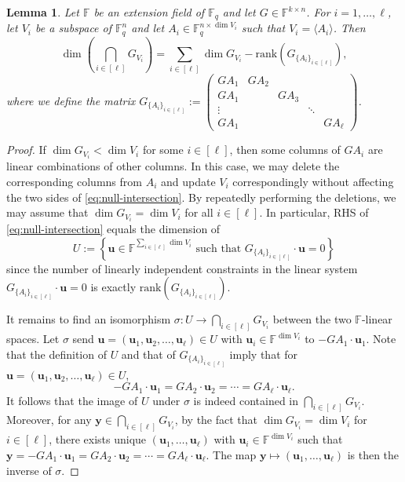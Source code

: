 \documentclass[11pt]{article}
\theoremstyle{plain}
\newtheorem{lemma}[thm]{Lemma}
\theoremstyle{definition}
\theoremstyle{remark}
\newcommand{\F}{\mathbb{F}}
\newcommand{\bv}{\bm{v}}
\newcommand{\bu}{\bm{u}}
\newcommand{\by}{\bm{y}}
\newcommand{\rank}{\mathrm{rank}}
\begin{document}
\begin{lemma}\label{fgva}
Let $\F$ be an extension field of $\F_q$ and let $G\in\F^{k\times n}$. For $i=1,\dots,\ell$, let $V_i$ be a subspace of $\F_q^n$ and let $A_i\in\F_q^{n\times \dim V_i}$ such that $V_i=\langle A_i\rangle$.
Then
\begin{equation}\label{eq:null-intersection}
\dim\left(\bigcap_{i\in[\ell]}G_{V_i}\right)=\sum_{i\in[\ell]}\dim  G_{V_i}-\rank\left(G_{\{A_i\}_{i\in[\ell]}}\right),    
\end{equation}
where we define the matrix $G_{\{A_i\}_{i\in[\ell]}}:=
\begin{pmatrix}
GA_1 & GA_2 &  &  &  \\GA_1 &  & GA_3 &  & \\
\vdots &  &  & \ddots &  \\GA_1 &  &  &  & GA_\ell
\end{pmatrix}$.
\end{lemma}
\begin{proof}
If $\dim G_{V_i}<\dim V_i$ for some $i\in [\ell]$, then some columns of $GA_i$ are linear combinations of other columns. In this case, we may delete the corresponding columns from $A_i$ and update $V_i$ correspondingly without affecting the two sides of \eqref{eq:null-intersection}.
By repeatedly performing the deletions, we may assume that $\dim G_{V_i}=\dim V_i$ for all $i\in [\ell]$. 
In particular, RHS of \eqref{eq:null-intersection} equals the dimension of  
\[
U:=\left\{\bu\in\F^{\sum_{i\in[\ell]}\dim V_i}\text{ such that } G_{\{A_i\}_{i\in[\ell]}}\cdot \bu=0\right\}
\]
since the number of linearly independent constraints in the linear system $G_{\{A_i\}_{i\in[\ell]}}\cdot \bu=0$ is exactly $\rank\left(G_{\{A_i\}_{i\in[\ell]}}\right)$.

It remains to find an isomorphism $\sigma: U\to \bigcap_{i\in[\ell]}G_{V_i}$ between the two $\F$-linear spaces.
Let $\sigma$ send $\bu=(\bu_1,\bu_2,\dots,\bu_\ell)\in U$ with $\bu_i\in \F^{\dim V_i}$ to $-GA_1\cdot \bu_1$. 
Note that the definition of $U$ and that of  $G_{\{A_i\}_{i\in[\ell]}}$ imply that for $\bu=(\bu_1,\bu_2,\dots,\bu_\ell)\in U$,
\begin{equation}\label{1z1}
-GA_1\cdot\bu_1=GA_2\cdot\bu_2=\cdots=GA_\ell\cdot\bu_\ell.
\end{equation}
It follows that the image of $U$ under $\sigma$ is indeed contained in $\bigcap_{i\in[\ell]}G_{V_i}$.
Moreover, for any $\by\in \bigcap_{i\in[\ell]}G_{V_i}$, by the fact that $\dim G_{V_i}=\dim V_i$ for $i\in [\ell]$, there exists unique $(\bu_1,\dots,\bu_\ell)$ with $\bu_i\in\F^{\dim V_i}$ such that $\by=-GA_1\cdot\bu_1=GA_2\cdot\bu_2=\cdots=GA_\ell\cdot\bu_\ell$.
The map $\by\mapsto (\bu_1,\dots,\bu_\ell)$ is then the inverse of $\sigma$.
\end{proof} 
\end{document}
